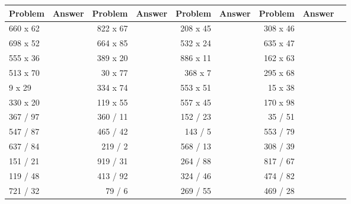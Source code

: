 \LARGE
\begin{tabular}{|l|r|r|r|r|r|r|r|r|}
\toprule
  Problem & Answer &   Problem & Answer &   Problem & Answer &   Problem & Answer \\ \midrule
\midrule
 660 x 62 &        &  822 x 67 &        &  208 x 45 &        &  308 x 46 &        \\ \midrule
 698 x 52 &        &  664 x 85 &        &  532 x 24 &        &  635 x 47 &        \\ \midrule
 555 x 36 &        &  389 x 20 &        &  886 x 11 &        &  162 x 63 &        \\ \midrule
 513 x 70 &        &   30 x 77 &        &   368 x 7 &        &  295 x 68 &        \\ \midrule
   9 x 29 &        &  334 x 74 &        &  553 x 51 &        &   15 x 38 &        \\ \midrule
 330 x 20 &        &  119 x 55 &        &  557 x 45 &        &  170 x 98 &        \\ \midrule
 367 / 97 &        &  360 / 11 &        &  152 / 23 &        &   35 / 51 &        \\ \midrule
 547 / 87 &        &  465 / 42 &        &   143 / 5 &        &  553 / 79 &        \\ \midrule
 637 / 84 &        &   219 / 2 &        &  568 / 13 &        &  308 / 39 &        \\ \midrule
 151 / 21 &        &  919 / 31 &        &  264 / 88 &        &  817 / 67 &        \\ \midrule
 119 / 48 &        &  413 / 92 &        &  324 / 46 &        &  474 / 82 &        \\ \midrule
 721 / 32 &        &    79 / 6 &        &  269 / 55 &        &  469 / 28 &        \\ \midrule
\bottomrule
\end{tabular}

